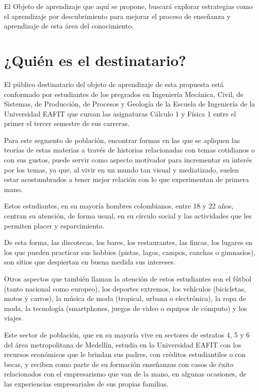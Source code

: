 \documentclass[twoside,letterpaper,11pt]{report}
\begin{document}
El Objeto de aprendizaje que aquí se propone, buscará explorar estrategias como el aprendizaje por descubrimiento para mejorar el proceso de enseñanza y aprendizaje de esta área del conocimiento.


\section{¿Quién es el destinatario?} %
\label{sec:_qui_n_es_el_destinatario_}

El público destinatario del objeto de aprendizaje de esta propuesta está conformado por estudiantes de los pregrados en Ingeniería Mecánica, Civil, de Sistemas, de Producción, de Procesos y Geología de la Escuela de Ingeniería de la Universidad EAFIT que cursan las asignaturas Cálculo 1 y Física 1 entre el primer el tercer semestre de sus carreras.

Para este segmento de población, encontrar formas en las que se apliquen las teorías de estas materias a través de historias relacionadas con temas cotidianos o con sus gustos, puede servir como aspecto motivador para incrementar su interés por los temas, ya que, al vivir en un mundo tan visual y mediatizado, suelen estar acostumbrados a tener mejor relación con lo que experimentan de primera mano.

Estos estudiantes, en su mayoría hombres colombianos, entre 18 y 22 años, centran su atención, de forma usual, en su círculo social y las actividades que les permiten placer y esparcimiento.

De esta forma, las discotecas, los bares, los restaurantes, las fincas, los lugares en los que pueden practicar sus hobbies (pistas, lagos, campos, canchas o gimnasios), son sitios que despiertan en buena medida sus intereses.

Otros aspectos que también llaman la atención de estos estudiantes son el fútbol (tanto nacional como europeo), los deportes extremos, los vehículos (bicicletas, motos y carros), la música de moda (tropical, urbana o electrónica), la ropa de moda, la tecnología (smartphones, juegos de video o equipos de cómputo) y los viajes. 

Este sector de población, que en su mayoría vive en sectores de estratos 4, 5 y 6 del área metropolitana de Medellín, estudia en la Universidad EAFIT con los recursos económicos que le brindan sus padres, con créditos estudiantiles o con becas, y reciben como parte de su formación enseñanzas con casos de éxito relacionados con el empresarismo que van de la mano, en algunas ocasiones, de las experiencias empresariales de sus propias familias.
\end{document}
